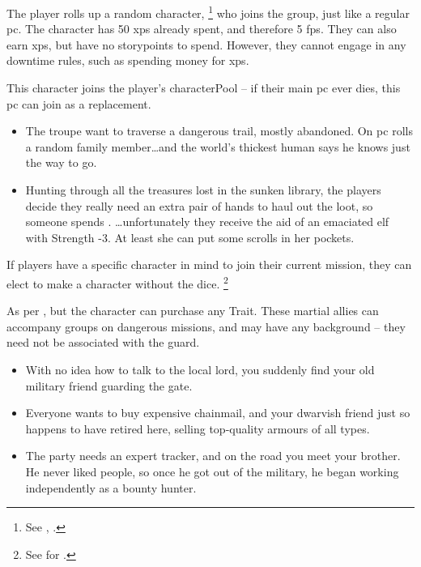 \begin{multicols}{2}
The player rolls up a random character,%
\footnote{See , .}
who joins the group, just like a regular \gls{pc}.
The character has 50 \glspl{xp} already spent, and therefore 5 \glspl{fp}.
They can also earn \glspl{xp}, but have no \glspl{storypoint} to spend. 
However, they cannot engage in any \gls{downtime} rules, such as spending money for \glspl{xp}.

This character joins the player's \gls{characterPool} -- if their main \gls{pc} ever dies, this \gls{pc} can join as a replacement.

\begin{itemize}
  \item
  The troupe want to traverse a dangerous trail, mostly abandoned.
  On \gls{pc} rolls a random family member\ldots and the world's thickest human says he knows just the way to go.
  \item
  Hunting through all the treasures lost in the sunken library, the players decide they really need an extra pair of hands to haul out the loot, so someone spends .
  \ldots unfortunately they receive the aid of an emaciated elf with Strength -3.
  At least she can put some scrolls in her pockets.
\end{itemize}

If players have a specific character in mind to join their current mission, they can elect to make a character without the dice.%
\footnote{See  for .}

As per , but the character can purchase any Trait.
These martial allies can accompany groups on dangerous missions, and may have any background -- they need not be associated with the \gls{guard}.

\begin{itemize}
  \item
  With no idea how to talk to the local lord, you suddenly find your old military friend guarding the gate.
  \item
  Everyone wants to buy expensive chainmail, and your dwarvish friend just so happens to have retired here, selling top-quality armours of all types.
  \item
  The party needs an expert tracker, and on the road you meet your brother.
  He never liked people, so once he got out of the military, he began working independently as a bounty hunter.
\end{itemize}


\end{multicols}
